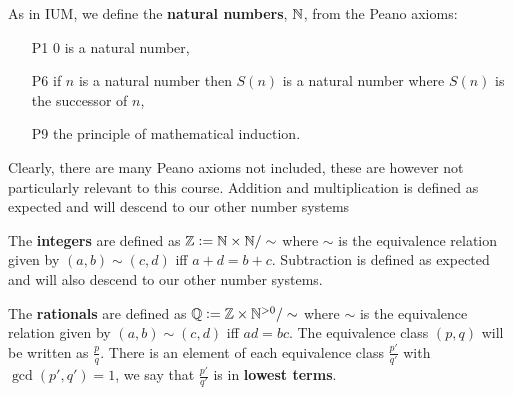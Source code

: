 \documentclass[../Year1/Year1.tex]{subfiles}
\begin{document}
\begin{definition}
    As in IUM, we define the \textbf{natural numbers}, $\mathbb{N}$, from the Peano axioms: \begin{enumerate}
        \item[P1] $0$ is a natural number,
        \item[P6] if $n$ is a natural number then $S(n)$ is a natural number where $S(n)$ is the successor of $n$,
        \item[P9] the principle of mathematical induction.
    \end{enumerate}
    Clearly, there are many Peano axioms not included, these are however not particularly relevant to this course. Addition and multiplication is defined as expected and will descend to our other number systems
\end{definition}

\begin{definition}[Integers]
    The \textbf{integers} are defined as $\mathbb{Z} := \mathbb{N}\times\mathbb{N}/\sim$ where $\sim$ is the equivalence relation given by $(a,b)\sim(c,d)$ iff $a+d = b+c$. Subtraction is defined as expected and will also descend to our other number systems.
\end{definition}

\begin{definition}[Rationals]
    The \textbf{rationals} are defined as $\mathbb{Q} := \mathbb{Z}\times\mathbb{N}^{>0}/\sim$ where $\sim$ is the equivalence relation given by $(a,b)\sim(c,d)$ iff $ad=bc$. The equivalence class $(p,q)$ will be written as $\frac{p}{q}$. There is an element of each equivalence class $\frac{p'}{q'}$ with $\gcd(p',q')=1$, we say that $\frac{p'}{q'}$ is in \textbf{lowest terms}.
\end{definition}
\end{document}
